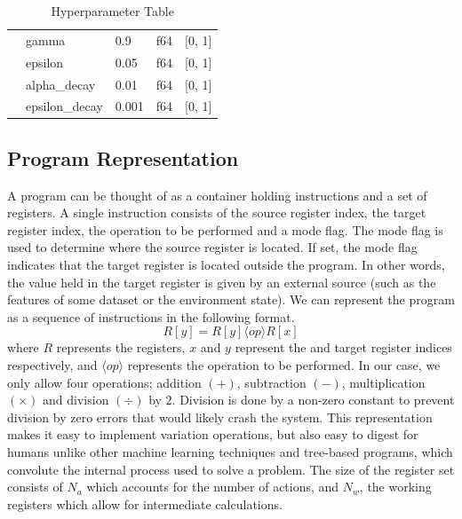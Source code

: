\documentclass[12pt, final]{dalcsthesis}
\begin{document}
\begin{table}[hb]
\begin{tabular}{|p{3.5cm}|p{3cm}|p{2.5cm}|p{1.5cm}|p{1.5cm}|}
		                                        & gamma                   & 0.9                    & f64                             & [0, 1]               \\ \cline{2-5}
		                                        & epsilon                 & 0.05                   & f64                             & [0, 1]               \\ \cline{2-5}
		                                        & alpha\_decay            & 0.01                   & f64                             & [0, 1]               \\ \cline{2-5}
		                                        & epsilon\_decay          & 0.001                  & f64                             & [0, 1]               \\ \hline
	\end{tabular}
	\caption{Hyperparameter Table}
	\label{table:hyperparameters}
\end{table}

\subsection{Program Representation}
A program can be thought of as a container holding instructions and a set of registers. A single instruction consists of the source register index, the target register index, the operation to be performed and a mode flag. The mode flag is used to determine where the source register is located. If set, the mode flag indicates that the target register is located outside the program. In other words, the value held in the target register is given by an external source (such as the features of some dataset or the environment state). We can represent the program as a sequence of instructions in the following format. $$R[y] = R[y] \langle op \rangle  R[x]$$ where $R$ represents the registers, $x$ and $y$ represent the and target register indices respectively, and $\langle op \rangle$ represents the operation to be performed. In our case, we only allow four operations; addition $(+)$,
subtraction $(-)$, multiplication $(\times)$ and division $(\div)$ by $2$. Division is done by a non-zero constant to prevent division by zero errors that would likely crash the system. This representation makes it easy to implement variation operations, but also easy to digest for humans unlike other machine learning techniques and tree-based programs, which convolute the internal process used to solve a problem. The size of the register set consists of $N_a$ which accounts for the number of actions, and $N_w$, the working registers which allow for intermediate calculations.
\end{document}

